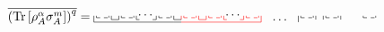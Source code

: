 \documentclass[a4paper,11pt]{article}
\newcommand{\Tr}{\text{Tr}}
\begin{document}
\begin{align}
    \overline{\left(\Tr\left[ \rho_A^{\alpha} \sigma_A^{m}\right]\right)^q} =     \tikz[scale=0.35,baseline=-0.5ex]{
    \draw[dashed] (0,0) -- (1,0);
    \draw (0,0)-- (0,.15);
    \draw (1,0)-- (1,.15);
    \draw (-0.2,0.15)-- (-0.2,-0.35);
    \draw (1.2,-0.15)-- (1.2,0.15);
    \draw[dashed,black] (2,0) -- (3,0);
    \draw[black] (2,0)-- (2,0.15);
    \draw[black] (3,0)-- (3,0.15);
    \draw[black] (1.8,-.15)-- (1.8,0.15);
    \draw[black] (3.2,-0.15)-- (3.2,0.15);
    \draw[dashed,black] (5,0) -- (6,0);
    \draw[black] (5,0)-- (5,0.15);
    \draw[black] (6,0)-- (6,0.15);
    \draw[black] (4.8,0.15)-- (4.8,-0.15);
    \draw[black] (6.2,-0.15)-- (6.2,0.15);
    \draw[red,dashed] (7+0,0) -- (7+1,0);
    \draw[red] (7+0,0)-- (7+0,.15);
    \draw[red] (7+1,0)-- (7+1,.15);
    \draw[red] (7-0.2,0.15)-- (7-0.2,-0.15);
    \draw[red] (7+1.2,-0.15)-- (7+1.2,0.15);
    \draw[dashed,red] (7+2,0) -- (7+3,0);
    \draw[red] (7+2,0)-- (7+2,0.15);
    \draw[red] (7+3,0)-- (7+3,0.15);
    \draw[red] (7+1.8,-.15)-- (7+1.8,0.15);
    \draw[red] (7+3.2,-0.15)-- (7+3.2,0.15);
    \draw[dashed,red] (7+5,0) -- (7+6,0);
    \draw[red] (7+5,0)-- (7+5,0.15);
    \draw[red] (7+6,0)-- (7+6,0.15);
    \draw[red] (7+4.8,0.15)-- (7+4.8,-0.15);
    \draw[red] (7+6.2,-0.35)-- (7+6.2,0.15);
    \draw (1.2,-0.15)--(1.8,-0.15);
    \draw[black] (3.2,-0.15)--(3.45,-0.15);
    \draw (-0.2,-0.35)-- (6.2,-0.35);
    \draw[black] (4.5,-0.15)--(4.8,-0.15);
    \node[] at (4.,0.2) {$\cdots$};
    \draw[black] (7-2+1.2,-0.15)--(7-2+1.8,-0.15);
    \draw[black] (7-2+1.2,-0.35)--(7-2+1.8,-0.35);
    \draw[red] (7+1.2,-0.15)--(7+1.8,-0.15);
    \draw[red] (7+3.2,-0.15)--(7+3.45,-0.15);
    \draw[red] (7-0.2,-0.35)-- (7+6.2,-0.35);
    \draw[red] (7+4.5,-0.15)--(7+4.8,-0.15);
    \node[] at (7+4.,0.2) {$\cdots$};
    }
    \hspace{.25cm}
    \dots
    \hspace{.25cm}
    \tikz[scale=0.35,baseline=-0.5ex]{
    \draw[dashed] (0,0) -- (1,0);
    \draw (0,0)-- (0,.15);
    \draw (1,0)-- (1,.15);
    \draw (-0.2,0.15)-- (-0.2,-0.35);
    \draw (1.2,-0.15)-- (1.2,0.15);
    \draw[dashed,black] (2,0) -- (3,0);
    \draw[black] (2,0)-- (2,0.15);
    \draw[black] (3,0)-- (3,0.15);
    \draw[black] (1.8,-.15)-- (1.8,0.15);
    \draw[black] (3.2,-0.15)-- (3.2,0.15);
    \draw[dashed,black] (5,0) -- (6,0);
    \draw[black] (5,0)-- (5,0.15);
    \draw[black] (6,0)-- (6,0.15);
}
\end{align}
\end{document}

